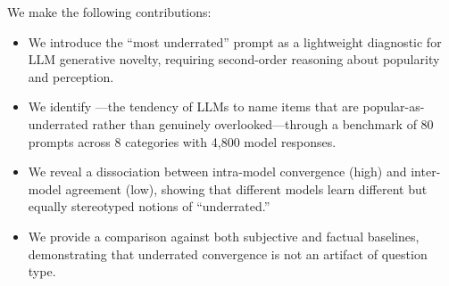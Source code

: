 We make the following contributions:
\begin{itemize}[leftmargin=*,itemsep=0pt,topsep=0pt]
    \item We introduce the ``most underrated'' prompt as a lightweight diagnostic for LLM generative novelty, requiring second-order reasoning about popularity and perception.
    \item We identify \metapop---the tendency of LLMs to name items that are popular-as-underrated rather than genuinely overlooked---through a benchmark of 80 prompts across 8 categories with 4,800 model responses.
    \item We reveal a dissociation between intra-model convergence (high) and inter-model agreement (low), showing that different models learn different but equally stereotyped notions of ``underrated.''
    \item We provide a comparison against both subjective and factual baselines, demonstrating that underrated convergence is not an artifact of question type.
\end{itemize}
